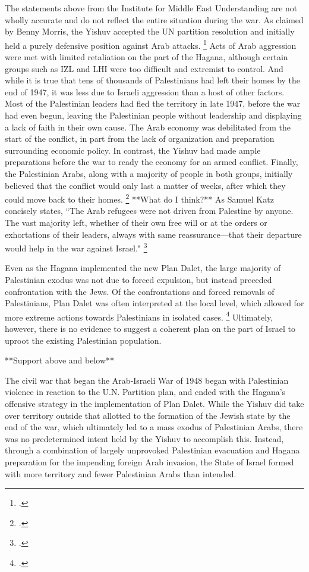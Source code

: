 \documentclass[11pt]{turabian-researchpaper}
\begin{document}
The statements above from the Institute for Middle East Understanding are not wholly accurate and do not reflect the entire situation during the war.  As claimed by Benny Morris, the Yishuv accepted the UN partition resolution and initially held a purely defensive position against Arab attacks.
\footcite[][98-100]{morris}
Acts of Arab aggression were met with limited retaliation on the part of the Hagana, although certain groups such as IZL and LHI were too difficult and extremist to control.
And while it is true that tens of thousands of Palestinians had left their homes by the end of 1947, it was less due to Israeli aggression than a host of other factors.  Most of the Palestinian leaders had fled the territory in late 1947, before the war had even begun, leaving the Palestinian people without leadership and displaying a lack of faith in their own cause.  The Arab economy was debilitated from the start of the conflict, in part from the lack of organization and preparation surrounding economic policy.  In contrast, the Yishuv had made ample preparations before the war to ready the economy for an armed conflict.  Finally, the Palestinian Arabs, along with a majority of people in both groups, initially believed that the conflict would only last a matter of weeks, after which they could move back to their homes.
\footcite[][84-85]{pappe}
**What do I think?**
As Samuel Katz concisely states, ``The Arab refugees were not driven from Palestine by anyone.  The vast majority left, whether of their own free will or at the orders or exhortations of their leaders, always with same reassurance—that their departure would help in the war against Israel."
\footcite[][64]{dajani}



Even as the Hagana implemented the new Plan Dalet, the large majority of Palestinian exodus was not due to forced expulsion, but instead preceded confrontation with the Jews.  Of the confrontations and forced removals of Palestinians, Plan Dalet was often interpreted at the local level, which allowed for more extreme actions towards Palestinians in isolated cases.
\footcite[][94]{morris}
Ultimately, however, there is no evidence to suggest a coherent plan on the part of Israel to uproot the existing Palestinian population.

**Support above and below**

The civil war that began the Arab-Israeli War of 1948 began with Palestinian violence in reaction to the U.N. Partition plan, and ended with the Hagana's offensive strategy in the implementation of Plan Dalet.  While the Yishuv did take over territory outside that allotted to the formation of the Jewish state by the end of the war, which ultimately led to a mass exodus of Palestinian Arabs, there was no predetermined intent held by the Yishuv to accomplish this.  Instead, through a combination of largely unprovoked Palestinian evacuation and Hagana preparation for the impending foreign Arab invasion, the State of Israel formed with more territory and fewer Palestinian Arabs than intended.
\end{document}
